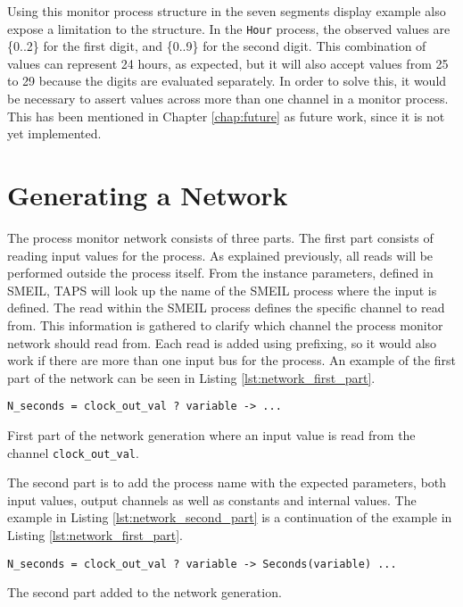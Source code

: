 Using this monitor process structure in the seven segments display example also expose a limitation to the structure. In the \texttt{Hour} process, the observed values are \{0..2\} for the first digit, and \{0..9\} for the second digit. This combination of values can represent 24 hours, as expected, but it will also accept values from 25 to 29 because the digits are evaluated separately. In order to solve this, it would be necessary to assert values across more than one channel in a monitor process. This has been mentioned in Chapter \ref{chap:future} as future work, since it is not yet implemented.
\section{Generating a \cspm{} Network}
The process monitor network consists of three parts. The first part consists of reading input values for the process. As explained previously, all reads will be performed outside the process itself. From the instance parameters, defined in SMEIL, TAPS will look up the name of the SMEIL process where the input is defined. The read within the SMEIL process defines the specific channel to read from. This information is gathered to clarify which \cspm{} channel the process monitor network should read from. Each read is added using prefixing, so it would also work if there are more than one input bus for the process. An example of the first part of the network can be seen in Listing \ref{lst:network_first_part}.
\begin{listing}
\begin{verbatim}
N_seconds = clock_out_val ? variable -> ...
\end{verbatim}
\caption{First part of the network generation where an input value is read from the channel \texttt{clock\_out\_val}.}
\label{lst:network_first_part}
\end{listing}
The second part is to add the process name with the expected parameters, both input values, output channels as well as constants and internal values. The example in Listing \ref{lst:network_second_part} is a continuation of the example in Listing \ref{lst:network_first_part}.
\begin{listing}
\begin{verbatim}
N_seconds = clock_out_val ? variable -> Seconds(variable) ...
\end{verbatim}
\caption{The second part added to the network generation.}
\label{lst:network_second_part}
\end{listing}

